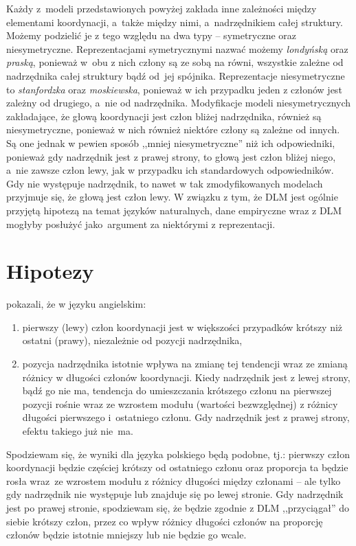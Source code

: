 \documentclass[licencjacka]{pracamgr_Kogni}
\begin{document}
    Każdy z~modeli przedstawionych powyżej zakłada inne zależności między elementami koordynacji, a~także między nimi, a~nadrzędnikiem całej struktury.
    Możemy podzielić je z tego względu na dwa typy -- symetryczne oraz niesymetryczne.
    Reprezentacjami symetrycznymi nazwać możemy \textit{londyńską} oraz \textit{praską}, ponieważ w~obu z nich człony są ze sobą na równi, wszystkie zależne od nadrzędnika całej struktury bądź od~jej spójnika.
    Reprezentacje niesymetryczne to \textit{stanfordzka} oraz \textit{moskiewska}, ponieważ w ich przypadku jeden z członów jest zależny od drugiego, a~nie od nadrzędnika.
    Modyfikacje modeli niesymetrycznych zakładające, że głową koordynacji jest człon bliżej nadrzędnika, również są niesymetryczne, ponieważ w nich również niektóre człony są zależne od innych. 
    Są one jednak w pewien sposób ,,mniej  niesymetryczne'' niż ich odpowiedniki, ponieważ gdy nadrzędnik jest z prawej strony, to głową jest człon bliżej niego, a~nie zawsze człon lewy, jak w przypadku ich standardowych odpowiedników.
    Gdy nie występuje nadrzędnik, to nawet w tak zmodyfikowanych modelach przyjmuje się, że głową jest człon lewy.
    W związku z tym, że DLM jest ogólnie przyjętą hipotezą na temat języków naturalnych, dane empiryczne wraz z DLM mogłyby posłużyć jako~argument za niektórymi z reprezentacji.

    \section{Hipotezy}\label{sec:hipotezy}
    \citet{Przepiorkowski2023} pokazali, że w języku angielskim:
    \begin{enumerate}[label=\arabic*)]
        \item pierwszy (lewy) człon koordynacji jest w większości przypadków krótszy niż ostatni (prawy), niezależnie od pozycji nadrzędnika,
        \item pozycja nadrzędnika istotnie wpływa na zmianę tej tendencji wraz ze zmianą różnicy w długości członów koordynacji. Kiedy nadrzędnik jest z lewej strony, bądź go nie ma, tendencja do umieszczania krótszego członu na pierwszej pozycji rośnie wraz ze wzrostem modułu (wartości bezwzględnej) z różnicy długości pierwszego i~ostatniego członu. Gdy nadrzędnik jest z prawej strony, efektu takiego już nie~ma.
    \end{enumerate}

    Spodziewam się, że wyniki dla języka polskiego będą podobne, tj.: pierwszy człon koordynacji będzie częściej krótszy od ostatniego członu oraz proporcja ta będzie rosła wraz~ze wzrostem modułu z różnicy długości między członami -- ale tylko gdy nadrzędnik nie występuje lub znajduje się po lewej stronie. Gdy nadrzędnik jest po prawej stronie, spodziewam się, że będzie zgodnie z DLM ,,przyciągał'' do siebie krótszy człon, przez co wpływ różnicy długości członów na proporcję członów będzie istotnie mniejszy lub nie będzie go wcale.
\end{document}
